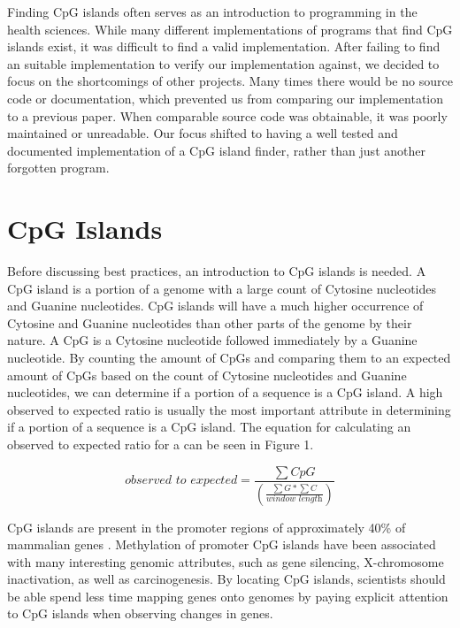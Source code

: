 \documentclass{bioinfo}
\begin{document}
Finding CpG islands often serves as an introduction to programming in the health sciences. While many different implementations of programs that find CpG islands exist, it was difficult to find a valid implementation. After failing to find an suitable implementation to verify our implementation against, we decided to focus on the shortcomings of other projects. Many times there would be no source code or documentation, which prevented us from comparing our implementation to a previous paper. When comparable source code was obtainable, it was poorly maintained or unreadable. Our focus shifted to having a well tested and documented implementation of a CpG island finder, rather than just another forgotten program.
    
\section{CpG Islands}

Before discussing best practices, an introduction to CpG islands is needed. A CpG island is a portion of a genome with a large count of Cytosine nucleotides and Guanine nucleotides. CpG islands will have a much higher occurrence of Cytosine and Guanine nucleotides than other parts of the genome by their nature. A CpG is a Cytosine nucleotide followed immediately by a Guanine nucleotide. By counting the amount of CpGs and comparing them to an expected amount of CpGs based on the count of Cytosine nucleotides and Guanine nucleotides, we can determine if a portion of a sequence is a CpG island. A high observed to expected ratio is usually the most important attribute in determining if a portion of a sequence is a CpG island. The equation for calculating an observed to expected ratio for a can be seen in Figure 1.

\begin{equation}
    \textit{observed to expected} = \frac{\sum CpG}{(\frac{\sum G * \sum C}{\textit{window length}})} \label{eq:01}
\end{equation}
      
CpG islands are present in the promoter regions of approximately 40\% of mammalian genes \citep{pmid11891299}. Methylation of promoter CpG islands have been associated with many interesting genomic attributes, such as gene silencing, X-chromosome inactivation, as well as carcinogenesis. By locating CpG islands, scientists should be able spend less time mapping genes onto genomes by paying explicit attention to CpG islands when observing changes in genes.
\end{document}
